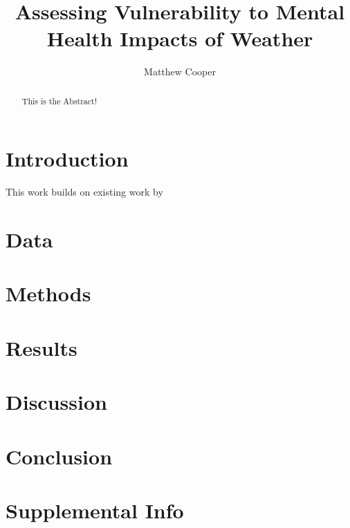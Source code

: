 \documentclass{article}
\begin{document}
\title{Assessing Vulnerability to Mental Health Impacts of Weather}

\author[1, *]{Matthew Cooper}


\maketitle
\begin{abstract}
  This is the Abstract!
\end{abstract}

\section{Introduction}
This work builds on existing work by \citep{baylis_weather_2018}

\section{Data}

\section{Methods}

\section{Results}

\section{Discussion}

\section{Conclusion}

\printbibliography

\section*{Supplemental Info}
\setcounter{table}{0}
\setcounter{figure}{0}
\setcounter{section}{0}
\renewcommand{\thetable}{S\arabic{table}}
\renewcommand{\thefigure}{S\arabic{figure}}
\renewcommand{\thesection}{S\arabic{section}}
\end{document}
